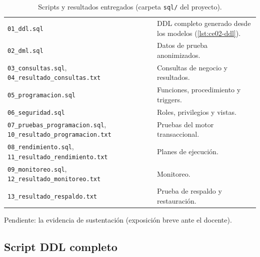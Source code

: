 \begin{table}[H]
\centering
\caption{Scripts y resultados entregados (carpeta \texttt{sql/} del proyecto).}
\label{tab:ce02-scripts}
\small
\begin{tabularx}{\textwidth}{L{5.2cm}X}
\toprule
\texttt{01\_ddl.sql} & DDL completo generado desde los modelos (\cref{lst:ce02-ddl}). \\
\texttt{02\_dml.sql} & Datos de prueba anonimizados. \\
\texttt{03\_consultas.sql}, \texttt{04\_resultado\_consultas.txt} & Consultas de negocio y resultados. \\
\texttt{05\_programacion.sql} & Funciones, procedimiento y triggers. \\
\texttt{06\_seguridad.sql} & Roles, privilegios y vistas. \\
\texttt{07\_pruebas\_programacion.sql}, \texttt{10\_resultado\_programacion.txt} & Pruebas del motor transaccional. \\
\texttt{08\_rendimiento.sql}, \texttt{11\_resultado\_rendimiento.txt} & Planes de ejecución. \\
\texttt{09\_monitoreo.sql}, \texttt{12\_resultado\_monitoreo.txt} & Monitoreo. \\
\texttt{13\_resultado\_respaldo.txt} & Prueba de respaldo y restauración. \\
\bottomrule
\end{tabularx}
\end{table}

\noindent Pendiente: la evidencia de sustentación (exposición breve ante el docente).

\subsection{Script DDL completo}




